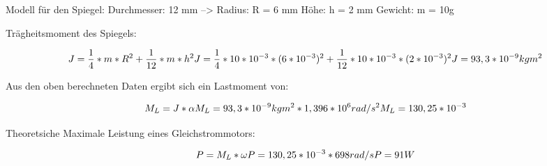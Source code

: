 Modell für den Spiegel:
Durchmesser: 12 mm --> Radius: R = 6 mm
Höhe: h = 2 mm
Gewicht: m = 10g

Trägheitsmoment des Spiegels: 
\begin{center}
\begin{equation}
J = \frac {1}{4} * m * R^2 + \frac {1} {12} * m * h^2\\
J = \frac {1}{4} * 10*10^{-3} * (6*10^{-3})^2 + \frac {1} {12} * 10*10^{-3} * (2*10^{-3})^2\\
J = 93,3 * 10^{-9} kg m^2
\end{equation}
\end{center}

Aus den oben berechneten Daten ergibt sich ein Lastmoment von:
\begin{center}
\begin{equation}
M_L = J * \alpha\\
M_L = 93,3 * 10^{-9} kg m^2 * 1,396 *10^6 rad/s^2 \\
M_L = 130,25 * 10^{-3}
\end{equation}
\end{center}

Theoretsiche Maximale Leistung eines Gleichstrommotors:
\begin{center}
\begin{equation}
P = M_L * \omega\\
P = 130,25 * 10^{-3} * 698 rad/s \\
P = 91 W
\end{equation}
\end{center}